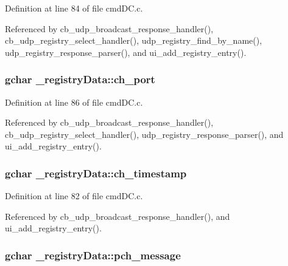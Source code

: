 Definition at line 84 of file cmd\+D\+C.\+c.



Referenced by cb\+\_\+udp\+\_\+broadcast\+\_\+response\+\_\+handler(), cb\+\_\+udp\+\_\+registry\+\_\+select\+\_\+handler(), udp\+\_\+registry\+\_\+find\+\_\+by\+\_\+name(), udp\+\_\+registry\+\_\+response\+\_\+parser(), and ui\+\_\+add\+\_\+registry\+\_\+entry().

\hypertarget{struct__registry_data_a74f03616af9ec9770266cb7988fe1a71}{
\subsubsection[{ch\+\_\+port}]{\setlength{\rightskip}{0pt plus 5cm}gchar \+\_\+registry\+Data\+::ch\+\_\+port}}\label{struct__registry_data_a74f03616af9ec9770266cb7988fe1a71}


Definition at line 86 of file cmd\+D\+C.\+c.



Referenced by cb\+\_\+udp\+\_\+broadcast\+\_\+response\+\_\+handler(), cb\+\_\+udp\+\_\+registry\+\_\+select\+\_\+handler(), udp\+\_\+registry\+\_\+response\+\_\+parser(), and ui\+\_\+add\+\_\+registry\+\_\+entry().

\hypertarget{struct__registry_data_a362a4edf89daafe79565053dd70892c4}{
\subsubsection[{ch\+\_\+timestamp}]{\setlength{\rightskip}{0pt plus 5cm}gchar \+\_\+registry\+Data\+::ch\+\_\+timestamp}}\label{struct__registry_data_a362a4edf89daafe79565053dd70892c4}


Definition at line 82 of file cmd\+D\+C.\+c.



Referenced by cb\+\_\+udp\+\_\+broadcast\+\_\+response\+\_\+handler(), and ui\+\_\+add\+\_\+registry\+\_\+entry().

\hypertarget{struct__registry_data_aad089cfecaeccff2c9c6bb7a97d46706}{
\subsubsection[{pch\+\_\+message}]{\setlength{\rightskip}{0pt plus 5cm}gchar \+\_\+registry\+Data\+::pch\+\_\+message}}\label{struct__registry_data_aad089cfecaeccff2c9c6bb7a97d46706}


